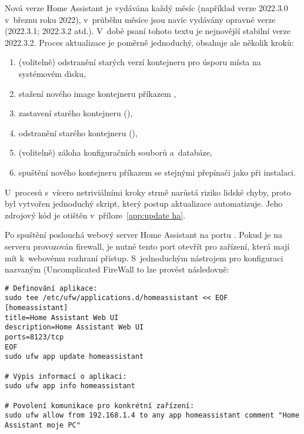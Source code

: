 Nová verze Home Assistant je vydávána každý měsíc (například verze 2022.3.0
v~březnu roku 2022), v~průběhu měsíce jsou navíc vydávány opravné verze
(2022.3.1; 2022.3.2 atd.). V~době psaní tohoto textu je nejnovější stabilní
verze 2022.3.2.
Proces aktualizace je poměrně jednoduchý, obsahuje ale několik kroků:
\begin{enumerate}[nosep]
    \item (volitelně) odstranění starých verzí kontejneru pro úsporu místa na
        systémovém disku,

    \item stažení nového image kontejneru příkazem ,

    \item zastavení starého kontejneru (),

    \item odstranění starého kontejneru (),

    \item (volitelně) záloha konfiguračních souborů a~databáze,

    \item spuštění nového kontejneru příkazem  se stejnými
        přepínači jako při instalaci.
\end{enumerate}
U~procesů s~vícero netriviálními kroky strmě narůstá riziko lidské chyby,
proto byl vytvořen jednoduchý skript, který postup aktualizace automatizuje.
Jeho zdrojový kód je otištěn v~příloze~\vref{app:update ha}.

Po spuštění poslouchá webový server Home Assistant na portu .
Pokud je na serveru provozován firewall, je nutné tento port otevřít pro
zařízení, která mají mít k~webovému rozhraní přístup. S~jednoduchým nástrojem
pro konfiguraci  nazvaným 
(\foreignlanguage{english}{Uncomplicated FireWall} to lze provést následovně:
\begin{lstlisting}[language=mybash]
# Definování aplikace:
sudo tee /etc/ufw/applications.d/homeassistant << EOF
[homeassistant]
title=Home Assistant Web UI
description=Home Assistant Web UI
ports=8123/tcp
EOF
sudo ufw app update homeassistant

# Výpis informací o aplikaci:
sudo ufw app info homeassistant

# Povolení komunikace pro konkrétní zařízení:
sudo ufw allow from 192.168.1.4 to any app homeassistant comment "Home Assistant moje PC"
\end{lstlisting}


